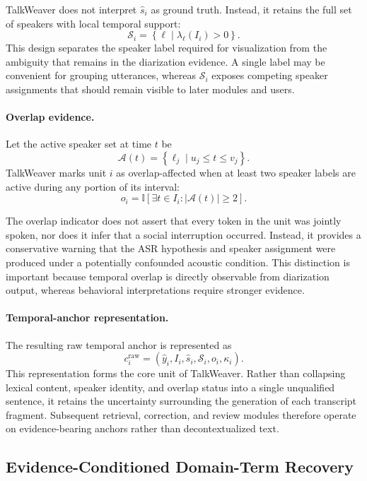 \documentclass[10pt,twocolumn]{article}
\begin{document}
TalkWeaver does not interpret \(\hat{s}_i\) as ground truth. Instead, it retains the full set of speakers with local temporal support:
\[
\mathcal{S}_i
=
\left\{
\ell
\mid
\lambda_{\ell}(I_i)>0
\right\}.
\]
This design separates the speaker label required for visualization from the ambiguity that remains in the diarization evidence. A single label may be convenient for grouping utterances, whereas \(\mathcal{S}_i\) exposes competing speaker assignments that should remain visible to later modules and users.

\paragraph{Overlap evidence.}
Let the active speaker set at time \(t\) be
\[
\mathcal{A}(t)
=
\left\{
\ell_j
\mid
u_j \leq t \leq v_j
\right\}.
\]
TalkWeaver marks unit \(i\) as overlap-affected when at least two speaker labels are active during any portion of its interval:
\[
o_i
=
\mathbb{I}
\left[
\exists t\in I_i:
\left|
\mathcal{A}(t)
\right|
\geq 2
\right].
\]

The overlap indicator does not assert that every token in the unit was jointly spoken, nor does it infer that a social interruption occurred. Instead, it provides a conservative warning that the ASR hypothesis and speaker assignment were produced under a potentially confounded acoustic condition. This distinction is important because temporal overlap is directly observable from diarization output, whereas behavioral interpretations require stronger evidence.

\paragraph{Temporal-anchor representation.}
The resulting raw temporal anchor is represented as
\[
c_i^{\mathrm{raw}}
=
\left(
\hat{y}_i,
I_i,
\hat{s}_i,
\mathcal{S}_i,
o_i,
\kappa_i
\right).
\]
This representation forms the core unit of TalkWeaver. Rather than collapsing lexical content, speaker identity, and overlap status into a single unqualified sentence, it retains the uncertainty surrounding the generation of each transcript fragment. Subsequent retrieval, correction, and review modules therefore operate on evidence-bearing anchors rather than decontextualized text.

\subsection{Evidence-Conditioned Domain-Term Recovery}
\end{document}
